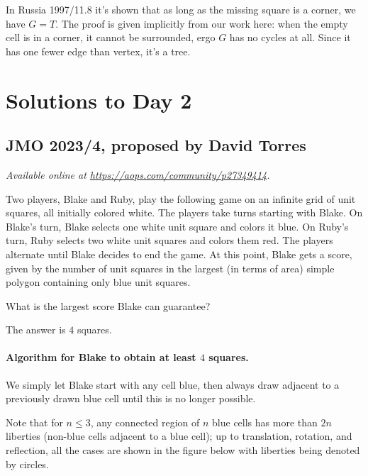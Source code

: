 \documentclass[11pt]{scrartcl}
\begin{document}
\begin{remark*}
  In Russia 1997/11.8 it's shown that as long as the missing square is a corner,
  we have $G = T$.
  The proof is given implicitly from our work here:
  when the empty cell is in a corner, it cannot be surrounded,
  ergo $G$ has no cycles at all.
  Since it has one fewer edge than vertex, it's a tree.
\end{remark*}
\pagebreak

\section{Solutions to Day 2}
\subsection{JMO 2023/4, proposed by David Torres}
\textsl{Available online at \url{https://aops.com/community/p27349414}.}
\begin{mdframed}[style=mdpurplebox,frametitle={Problem statement}]
Two players, Blake and Ruby, play the following game
on an infinite grid of unit squares, all initially colored white.
The players take turns starting with Blake.
On Blake's turn, Blake selects one white unit square and colors it blue.
On Ruby's turn, Ruby selects two white unit squares and colors them red.
The players alternate until Blake decides to end the game.
At this point, Blake gets a score, given by the number of unit squares in the
largest (in terms of area) simple polygon containing only blue unit squares.

What is the largest score Blake can guarantee?
\end{mdframed}
The answer is $4$ squares.

\paragraph{Algorithm for Blake to obtain at least $4$ squares.}
We simply let Blake start with any cell blue,
then always draw adjacent to a previously drawn blue cell
until this is no longer possible.

Note that for $n \le 3$, any connected region of $n$ blue cells
has more than $2n$ liberties (non-blue cells adjacent to a blue cell);
up to translation, rotation, and reflection,
all the cases are shown in the figure below
with liberties being denoted by circles.
\end{document}
